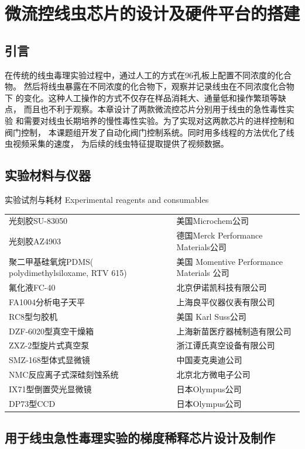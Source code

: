 \chapter{微流控线虫芯片的设计及硬件平台的搭建}
\section{引言}
	在传统的线虫毒理实验过程中，通过人工的方式在96孔板上配置不同浓度的化合物。
	然后将线虫暴露在不同浓度的化合物下，观察并记录线虫在不同浓度化合物下
	的变化。这种人工操作的方式不仅存在样品消耗大、通量低和操作繁琐等缺点， 
	而且也不利于观察。本章设计了两款微流控芯片分别用于线虫的急性毒性实验
	和需要对线虫长期培养的慢性毒性实验。为了实现对这两款芯片的进样控制和阀门控制，
	本课题组开发了自动化阀门控制系统。同时用多线程的方法优化了线虫视频采集的速度，
	为后续的线虫特征提取提供了视频数据。
\section{实验材料与仪器}
	
	\begin{table}[htbp]
	\centering
	\bicaption
    {实验试剂与耗材}
    {Experimental reagents and consumables}
	\begin{tabular}{p{150pt}p{230pt}}
	\toprule
		光刻胶SU-83050 & 美国Microchem公司\\
		光刻胶AZ4903 & 德国Merck Performance Materials公司\\
		聚二甲基硅氧烷PDMS( polydimethylsiloxame, RTV 615) &美国 Momentive Performance Materials 公司\\
		氟化液FC-40 & 北京伊诺凯科技有限公司\\
		FA1004分析电子天平 & 上海良平仪器仪表有限公司\\
		RC8型匀胶机 & 美国 Karl Suss公司\\
		DZF-6020型真空干燥箱& 上海新苗医疗器械制造有限公司\\
		ZXZ-2型旋片式真空泵 & 浙江谭氏真空设备有限公司\\
		SMZ-168型体式显微镜& 中国麦克奥迪公司 \\
		NMC反应离子式深硅刻蚀系统 & 北京北方微电子公司\\
		IX71型倒置荧光显微镜 & 日本Olympus公司\\
		DP73型CCD & 日本Olympus公司\\
	\bottomrule
	\end{tabular}
	\end{table}	
\section{用于线虫急性毒理实验的梯度稀释芯片设计及制作}
